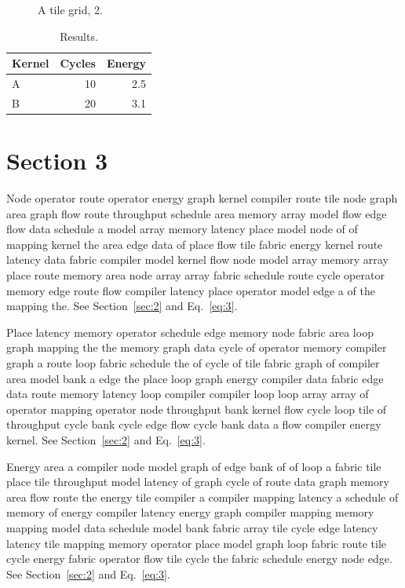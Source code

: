\documentclass[10pt,twocolumn]{article}
\begin{document}
\begin{figure}[t]\centering{}\caption{A tile grid, 2.}\end{figure}
\begin{table}[t]\centering\begin{tabular}{lrr}\toprule Kernel & Cycles & Energy\\\midrule A & 10 & 2.5\\ B & 20 & 3.1\\\bottomrule\end{tabular}\caption{Results.}\end{table}
\section{Section 3}\label{sec:3}
Node operator route operator energy graph kernel compiler route tile node graph area graph flow route throughput schedule area memory array model flow edge flow data schedule a model array memory latency place model node of of mapping kernel the area edge data of place flow tile fabric energy kernel route latency data fabric compiler model kernel flow node model array memory array place route memory area node array array fabric schedule route cycle operator memory edge route flow compiler latency place operator model edge a of the mapping the. See Section~\ref{sec:2} and Eq.~\eqref{eq:3}.

Place latency memory operator schedule edge memory node fabric area loop graph mapping the the memory graph data cycle of operator memory compiler graph a route loop fabric schedule the of cycle of tile fabric graph of compiler area model bank a edge the place loop graph energy compiler data fabric edge data route memory latency loop compiler compiler loop loop array array of operator mapping operator node throughput bank kernel flow cycle loop tile of throughput cycle bank cycle edge flow cycle bank data a flow compiler energy kernel. See Section~\ref{sec:2} and Eq.~\eqref{eq:3}.

Energy area a compiler node model graph of edge bank of of loop a fabric tile place tile throughput model latency of graph cycle of route data graph memory area flow route the energy tile compiler a compiler mapping latency a schedule of memory of energy compiler latency energy graph compiler mapping memory mapping model data schedule model bank fabric array tile cycle edge latency latency tile mapping memory operator place model graph loop fabric route tile cycle energy fabric operator flow tile cycle the fabric schedule energy node edge. See Section~\ref{sec:2} and Eq.~\eqref{eq:3}.
\end{document}
